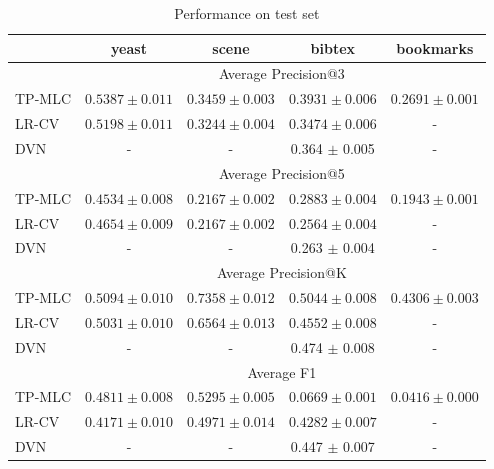 \begin{table}[!h]
\centering
\caption{Performance on test set}
\begin{tabular}{l|cccc} \hline \hline
 & yeast & scene & bibtex & bookmarks \\ \hline
 & \multicolumn{4}{c}{Average Precision@3} \\ \hline
TP-MLC & $0.5387 \pm  0.011$ & $0.3459 \pm  0.003$ & $0.3931 \pm  0.006$ & $0.2691 \pm  0.001$ \\
LR-CV & $0.5198 \pm  0.011$ & $0.3244 \pm  0.004$ & $0.3474 \pm  0.006$ & - \\
DVN & - & - & 0.364 $\pm$ 0.005 & - \\ \hline
 & \multicolumn{4}{c}{Average Precision@5} \\ \hline
TP-MLC & $0.4534 \pm  0.008$ & $0.2167 \pm  0.002$ & $0.2883 \pm  0.004$ & $0.1943 \pm  0.001$ \\
LR-CV & $0.4654 \pm  0.009$ & $0.2167 \pm  0.002$ & $0.2564 \pm  0.004$ & - \\
DVN & - & - & 0.263 $\pm$ 0.004 & - \\ \hline
 & \multicolumn{4}{c}{Average Precision@K} \\ \hline
TP-MLC & $0.5094 \pm  0.010$ & $0.7358 \pm  0.012$ & $0.5044 \pm  0.008$ & $0.4306 \pm  0.003$ \\
LR-CV & $0.5031 \pm  0.010$ & $0.6564 \pm  0.013$ & $0.4552 \pm  0.008$ & - \\
DVN & - & - & 0.474 $\pm$ 0.008 & - \\ \hline
 & \multicolumn{4}{c}{Average F1} \\ \hline
TP-MLC & $0.4811 \pm  0.008$ & $0.5295 \pm  0.005$ & $0.0669 \pm  0.001$ & $0.0416 \pm  0.000$ \\
LR-CV & $0.4171 \pm  0.010$ & $0.4971 \pm  0.014$ & $0.4282 \pm  0.007$ & - \\
DVN & - & - & 0.447 $\pm$ 0.007 & - \\ \hline
\end{tabular}
\end{table}
